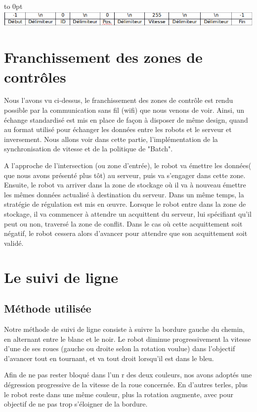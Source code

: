 \documentclass[french,a4paper,12pt]{report}
\begin{document}
\hfill\hbox to 0pt{\hss\includegraphics[width=15cm]{val2.png}\hss}\hfill\null\newline

\chapter{Franchissement des zones de contrôles}
Nous l'avons vu ci-dessus, le franchissement des zones de contrôle est rendu possible par la communication sans fil (wifi) que nous venons de voir. Ainsi, un échange standardisé est mis en place de façon à disposer de même design, quand au format utilisé pour échanger les données entre les robots et le serveur et inversement.
Nous allons voir dans cette partie, l'implémentation de la synchronisation de vitesse et de la politique de "Batch".


A l'approche de l'intersection (ou zone d'entrée), le robot va émettre les données( que nous avons présenté plus tôt) au serveur, puis va s'engager dans cette zone.
Ensuite, le robot va arriver dans la zone de stockage où il va à nouveau émettre les mêmes données actualisé à destination du serveur. Dans un même temps, la stratégie de régulation est mis en œuvre. Lorsque le robot entre dans la zone de stockage, il va commencer à attendre un acquittent du serveur, lui spécifiant qu'il peut ou non, traversé la zone de conflit. Dans le cas où cette acquittement soit négatif, le robot cessera alors d'avancer pour attendre que son acquittement soit validé.

\chapter{Le suivi de ligne} %

\section{Méthode utilisée}
Notre méthode de suivi de ligne consiste à suivre la bordure gauche du chemin, en alternant entre le blanc et le noir. Le robot diminue progressivement la vitesse d’une de ses roues (gauche ou droite selon la rotation voulue) dans l’objectif d’avancer tout en tournant, et va tout droit lorsqu’il est dans le bleu.

Afin de ne pas rester bloqué dans l'un r des deux couleurs, nos avons adoptés une dégression progressive de la vitesse de la roue concernée. En d'autres terles, plus le robot reste dans une même couleur, plus la rotation augmente, avec pour objectif de ne pas trop s'éloigner de la bordure.
\end{document}
